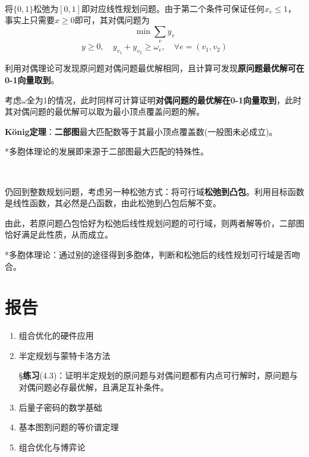 \documentclass[a4paper,UTF8,fontset=windows]{ctexart}
\newcommand{\exce}[2]{\S\textbf{练习}(#1)：{\kaishu #2}}
\begin{document}
\

将$\{0,1\}$松弛为$[0,1]$即对应线性规划问题。由于第二个条件可保证任何$x_e\le1$，事实上只需要$x\ge0$即可，其对偶问题为
$$\min\sum_vy_v$$
$$y\ge0,\quad y_{v_1}+y_{v_2}\ge\omega_e,\quad\forall e=(v_1,v_2)$$

利用对偶理论可发现原问题对偶问题最优解相同，且计算可发现\textbf{原问题最优解可在0-1向量取到}。

考虑$\omega$全为1的情况，此时同样可计算证明\textbf{对偶问题的最优解在0-1向量取到}，此时其对偶问题的最优解可以取为最小顶点覆盖问题的解。

\textbf{K\"onig定理}：\textbf{二部图}最大匹配数等于其最小顶点覆盖数(一般图未必成立)。

*多胞体理论的发展即来源于二部图最大匹配的特殊性。

\

仍回到整数规划问题，考虑另一种松弛方式：将可行域\textbf{松弛到凸包}。利用目标函数是线性函数，其必然是凸函数，由此松弛到凸包后解不变。

由此，若原问题凸包恰好为松弛后线性规划问题的可行域，则两者解等价，二部图恰好满足此性质，从而成立。

*多胞体理论：通过别的途径得到多胞体，判断和松弛后的线性规划可行域是否吻合。
\newpage
\appendix
\section{报告}
\begin{enumerate}
    \item 组合优化的硬件应用
    \item 半定规划与蒙特卡洛方法
    
    \exce{4.3}{证明半定规划的原问题与对偶问题都有内点可行解时，原问题与对偶问题必存最优解，且满足互补条件。}
    \item 后量子密码的数学基础
    \item 基本图割问题的等价谱定理
    \item 组合优化与博弈论
\end{enumerate}
\end{document}
